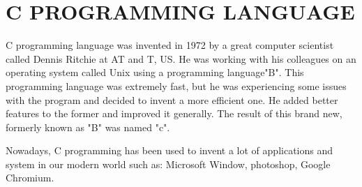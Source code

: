 \documentclass{article}
\begin{document}
	\section*{C PROGRAMMING LANGUAGE}
	C programming language was invented in 1972 by a great computer scientist called Dennis Ritchie at AT and T, US. He was working with his colleagues on an operating system called Unix using a programming language"B". This programming language was extremely fast, but he was experiencing some issues with the program and decided to invent a more efficient one. He added better features to the former and improved it generally. The result of this brand new, formerly known as "B" was named "c".
	
	Nowadays, C programming has been used to invent a lot of applications and system in our modern world such as: Microsoft Window, photoshop, Google Chromium.
\end{document}
